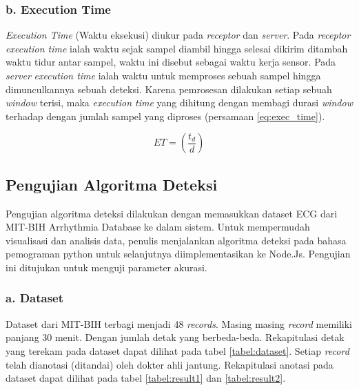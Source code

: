 \subsubsection{b. Execution Time}
\textit{Execution Time} (Waktu eksekusi) diukur pada \textit{receptor} dan \textit{server}. Pada \textit{receptor} \textit{execution time} ialah waktu sejak sampel diambil hingga selesai dikirim ditambah waktu tidur antar sampel, waktu ini disebut sebagai waktu kerja sensor. Pada \textit{server} \textit{execution time} ialah waktu untuk memproses sebuah sampel hingga dimunculkannya sebuah deteksi. Karena pemrosesan dilakukan setiap sebuah \textit{window} terisi, maka \textit{execution time} yang dihitung dengan membagi durasi \textit{window} terhadap dengan jumlah sampel yang diproses (persamaan \ref{eq:exec_time}).

\begin{equation}
ET = (\frac{t_d}{d})
\label{eq:exec_time} 
\end{equation}


\subsection{Pengujian Algoritma Deteksi}
Pengujian algoritma deteksi dilakukan dengan memasukkan dataset ECG dari MIT-BIH Arrhythmia Database \cite{mit_bih_paper, mit_bih_web} ke dalam sistem. Untuk mempermudah visualisasi dan analisis data, penulis menjalankan algoritma deteksi pada bahasa pemograman python untuk selanjutnya diimplementasikan ke Node.Js. Pengujian ini ditujukan untuk menguji parameter akurasi.

\subsubsection{a. Dataset}
Dataset dari MIT-BIH \cite{mit_bih_paper, mit_bih_web} terbagi menjadi 48 \textit{records}. Masing masing \textit{record} memiliki panjang 30 menit. Dengan jumlah detak yang berbeda-beda. Rekapitulasi detak yang terekam pada dataset dapat dilihat pada tabel \ref{tabel:dataset}. Setiap \textit{record} telah dianotasi (ditandai) oleh dokter ahli jantung\cite{mit_bih_web}. Rekapitulasi anotasi pada dataset dapat dilihat pada tabel \ref{tabel:result1}  dan \ref{tabel:result2}.


